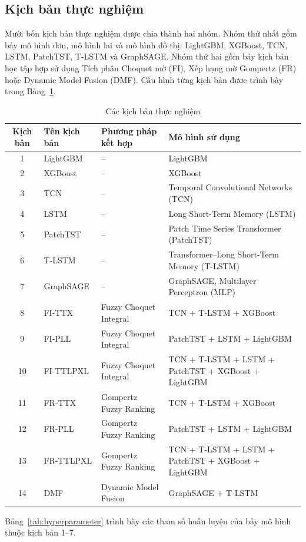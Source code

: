 \documentclass[10pt,twoside]{article}
\begin{document}
\subsection{Kịch bản thực nghiệm}
Mười bốn kịch bản thực nghiệm được chia thành hai nhóm. Nhóm thứ nhất gồm bảy mô hình đơn, mô hình lai và mô hình đồ thị: LightGBM, XGBoost, TCN, LSTM, PatchTST, T-LSTM và GraphSAGE. Nhóm thứ hai gồm bảy kịch bản học tập hợp sử dụng Tích phân Choquet mờ (FI), Xếp hạng mờ Gompertz (FR) hoặc Dynamic Model Fusion (DMF). Cấu hình từng kịch bản được trình bày trong Bảng~\ref{tab:experimental_scenarios}.
\begin{table}[!htbp] 
\centering 
\caption{Các kịch bản thực nghiệm} 
\label{tab:experimental_scenarios} 
\begin{tabular}{c l l >{\raggedright\arraybackslash}p{6.5cm}} 
\hline 
\textbf{Kịch bản} & \textbf{Tên kịch bản} & \textbf{Phương pháp kết hợp} & \textbf{Mô hình sử dụng} \\ \hline 
1 & LightGBM & -- & LightGBM \\ 
2 & XGBoost & -- & XGBoost \\ 
3 & TCN & -- & Temporal Convolutional Networks (TCN) \\ 
4 & LSTM & -- & Long Short-Term Memory (LSTM) \\ 
5 & PatchTST & -- & Patch Time Series Transformer (PatchTST) \\ 
6 & T-LSTM & -- & Transformer--Long Short-Term Memory (T-LSTM) \\ 
7 & GraphSAGE & -- & GraphSAGE, Multilayer Perceptron (MLP) \\ 
8 & FI-TTX & Fuzzy Choquet Integral & TCN + T-LSTM + XGBoost \\ 
9 & FI-PLL & Fuzzy Choquet Integral & PatchTST + LSTM + LightGBM \\ 
10 & FI-TTLPXL & Fuzzy Choquet Integral & TCN + T-LSTM + LSTM + PatchTST + XGBoost + LightGBM \\ 
11 & FR-TTX & Gompertz Fuzzy Ranking & TCN + T-LSTM + XGBoost \\ 
12 & FR-PLL & Gompertz Fuzzy Ranking & PatchTST + LSTM + LightGBM \\ 
13 & FR-TTLPXL & Gompertz Fuzzy Ranking & TCN + T-LSTM + LSTM + PatchTST + XGBoost + LightGBM \\ 
14 & DMF & Dynamic Model Fusion & GraphSAGE + T-LSTM \\ \hline \end{tabular} 
\end{table}
Bảng~\ref{tab:hyperparameter} trình bày các tham số huấn luyện của bảy mô hình thuộc kịch bản 1--7.
\end{document}
